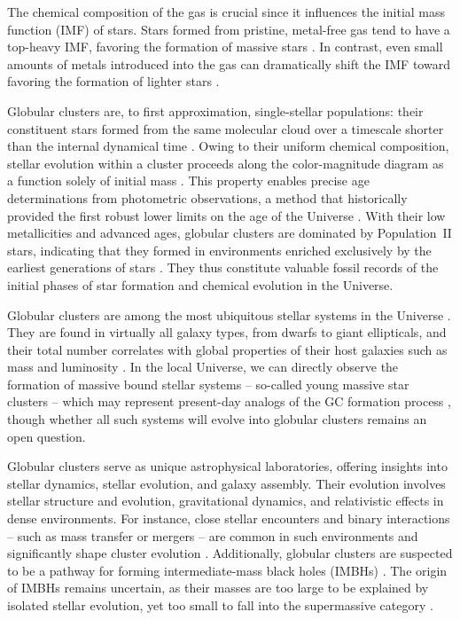     The chemical composition of the gas is crucial since it influences the initial mass function (IMF) of stars. Stars formed from pristine, metal-free gas tend to have a top-heavy IMF, favoring the formation of massive stars \citep{2002ApJ...571...30S,2006MNRAS.369..825S}. In contrast, even small amounts of metals introduced into the gas can dramatically shift the IMF toward favoring the formation of lighter stars \citep{2021MNRAS.508.4175C}.

    Globular clusters are, to first approximation, single-stellar populations: their constituent stars formed from the same molecular cloud over a timescale shorter than the internal dynamical time \citep{1988ApJ...324..288A,2009MNRAS.397..954F,2014PhR...539...49K}. Owing to their uniform chemical composition, stellar evolution within a cluster proceeds along the color-magnitude diagram as a function solely of initial mass \citep{2013sse..book.....K}. This property enables precise age determinations from photometric observations, a method that historically provided the first robust lower limits on the age of the Universe \citep{1959MNRAS.119..124H,1970ApJ...162..841S,1985A&A...147..169G,1992ApJ...400..265M}. With their low metallicities and advanced ages, globular clusters are dominated by Population~II stars, indicating that they formed in environments enriched exclusively by the earliest generations of stars \citep{2022A&A...668A.191C}. They thus constitute valuable fossil records of the initial phases of star formation and chemical evolution in the Universe.
    
    Globular clusters are among the most ubiquitous stellar systems in the Universe \citep{2006ARA&A..44..193B,2019ARA&A..57..227K}. They are found in virtually all galaxy types, from dwarfs to giant ellipticals, and their total number correlates with global properties of their host galaxies such as mass and luminosity \citep[e.g.,][]{2013ApJ...772...82H,2018MNRAS.481.5592F}. In the local Universe, we can directly observe the formation of massive bound stellar systems -- so-called young massive star clusters -- which may represent present-day analogs of the GC formation process \citep[e.g.,][]{2010ARA&A..48..431P,2020SSRv..216...69A}, though whether all such systems will evolve into globular clusters remains an open question.

    Globular clusters serve as unique astrophysical laboratories, offering insights into stellar dynamics, stellar evolution, and galaxy assembly. Their evolution involves stellar structure and evolution, gravitational dynamics, and relativistic effects in dense environments. For instance, close stellar encounters and binary interactions -- such as mass transfer or mergers -- are common in such environments and significantly shape cluster evolution \citep{2004MNRAS.349..129D,2016MNRAS.458.1450W,2024MNRAS.528.5119A}. Additionally, globular clusters are suspected to be a pathway for forming intermediate-mass black holes (IMBHs) \citep{2013MNRAS.432.2779B,2015MNRAS.454.3150G}. The origin of IMBHs remains uncertain, as their masses are too large to be explained by isolated stellar evolution, yet too small to fall into the supermassive category \citep{2020ARA&A..58..257G}. 
    
